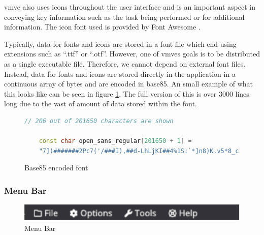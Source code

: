 \documentclass[11pt]{article}
\begin{document}
\gls{vmve} also uses icons throughout the user interface and is an important
aspect in conveying key information such as the task being performed or for
additional information. The icon font used is provided by Font Awesome
\cite{font-awesome}.

Typically, data for fonts and icons are stored in a font file which end using
extensions such as ``.ttf'' or ``.otf''. However, one of \glspl{vmve} goals is
to be distributed as a single executable file. Therefore, we cannot depend on
external font files. Instead, data for fonts and icons are stored directly in
the application in a continuous array of bytes and are encoded in base85. An
small example of what this looks like can be seen in figure
\ref{fig:base85_font}. The full version of this is over 3000 lines long due to
the vast of amount of data stored within the font.

\begin{figure}[h!]
  \centering
  \begin{lstlisting}[language=C++]
    // 206 out of 201650 characters are shown

    const char open_sans_regular[201650 + 1] =
    "7])#######2Pc7('/###I),##d-LhLjKI##4%1S:`*]n8)K.v5*8_c)iZ;99=$$$$c(m]4pKdp/(RdL<snZo'oI,hLNDnx4Uu/>8Q7oo^eFb3hB4JYc'Tx-3l_wgd2Tf._r+&sAqV,-G"":F8LD=5,n]A&aA+<gXG-<iobW&>$>QJ8Z.W$jg0Fv-o^(^JJnf4T"
  \end{lstlisting}
  \caption{Base85 encoded font}
  \label{fig:base85_font}
\end{figure}

\subsubsection{Menu Bar}

\begin{figure}[h!]
  \centering
  \includegraphics[width=\textwidth]{images/menu_bar.png}
  \caption{Menu Bar}
  \label{fig:menu_bar}
\end{figure}
\end{document}
